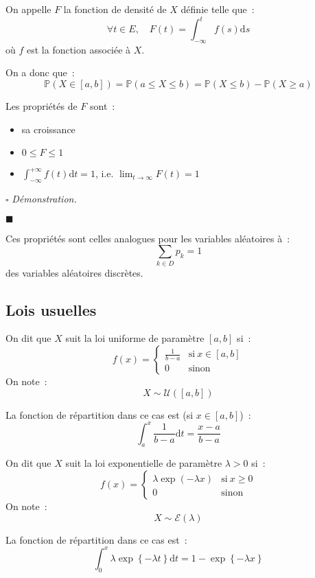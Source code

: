 \documentclass[a4paper, titlepage]{article}
\renewenvironment{proof}{$\square$ \footnotesize\textit{Démonstration.}}{\begin{flushright}$\blacksquare$\end{flushright}}
\begin{document}
	\begin{defn}
		On appelle $F$ la fonction de densité de $X$ définie telle que~:
		$$ \forall t\in E,\quad F(t)=\int^{t}_{-\infty} f(s)\mathrm{d}s $$
		où $f$ est la fonction associée à $X$.
	\end{defn}

	\begin{props}
		On a donc que~:
		$$ \mathbb{P}(X\in[a,b]) = \mathbb{P}(a\leqslant X\leqslant b) = \mathbb{P}(X\leqslant b) - \mathbb{P}(X\geqslant a) $$
	\end{props}

	\begin{props}
		Les propriétés de $F$ sont~:
		\begin{itemize}
			\item  sa croissance
			\item $0\leqslant F\leqslant 1$
			\item $\displaystyle\int^{+\infty}_{-\infty}f(t)\mathrm{d}t = 1$, i.e. $\displaystyle\lim_{t \to \infty} F(t) = 1$
		\end{itemize}
	\end{props}
	\begin{proof}
		\AQT
	\end{proof}
	Ces propriétés sont celles analogues pour les variables aléatoires à~:
	$$ \sum_{k\in D} p_k = 1 $$
	des variables aléatoires discrètes.

	\subsection{Lois usuelles}
	\begin{defn}
		On dit que $X$ suit la loi uniforme de paramètre $[a,b]$ si~:
		$$ f(x) =
		\left\{\begin{matrix}
				\frac{1}{b-a}&\text{si}~x\in[a,b]\\
				0 &\text{sinon}
		\end{matrix}\right. $$
		On note~:
		$$ X\sim\mathcal{U} ([a,b]) $$
	\end{defn}
	La fonction de répartition dans ce cas est (si $x\in[a,b]$)~:
	$$ \int_a^x \frac{1}{b-a}\mathrm{d}t = \frac{x-a}{b-a} $$

	\begin{defn}
		On dit que $X$ suit la loi exponentielle de paramètre $\lambda > 0$ si~:
		$$ f(x) = \left\{\begin{matrix} \lambda \exp\left( -\lambda x \right) &\text{si}~x\geqslant 0\\ 0 &\text{sinon} \end{matrix}\right. $$
		On note~:
		$$ X\sim\mathcal{E}(\lambda) $$
	\end{defn}
	La fonction de répartition dans ce cas est~:
	$$ \int_0^x \lambda\exp\left\{ -\lambda t \right\} \mathrm{d}t = 1-\exp\left\{ -\lambda x \right\}  $$
\end{document}
